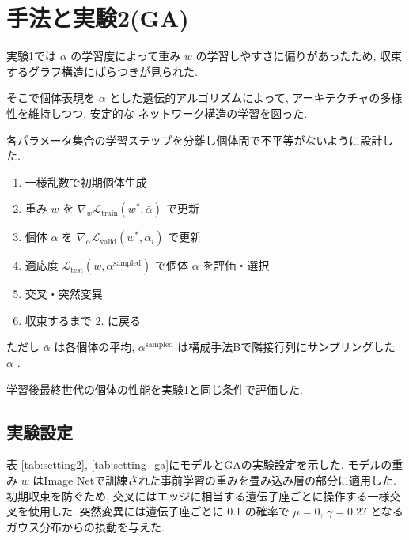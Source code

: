 \documentclass[twocolumn]{jarticle}     %
\begin{document}
\section{手法と実験2(GA)}
実験1では $\alpha$ の学習度によって重み $w$ の学習しやすさに偏りがあったため,
収束するグラフ構造にばらつきが見られた.

そこで個体表現を $\alpha$ とした遺伝的アルゴリズムによって,
アーキテクチャの多様性を維持しつつ, 安定的な
ネットワーク構造の学習を図った.

各パラメータ集合の学習ステップを分離し個体間で不平等がないように設計した.

\begin{enumerate}
  \item 一様乱数で初期個体生成
  \item 重み $w$ を $\displaystyle \nabla_w \mathcal{L}_{\mathrm{train}}(w^*, \bar{\alpha})$ で更新
  \item 個体 $\alpha$ を $\displaystyle \nabla_\alpha \mathcal{L}_{\mathrm{valid}}(w^*, \alpha_i)$ で更新
  \item 適応度 $\displaystyle \mathcal{L}_{\mathrm{test}}(w, \alpha^\mathrm{sampled})$ で個体 $\alpha$ を評価・選択
  \item 交叉・突然変異
  \item 収束するまで 2. に戻る
\end{enumerate}
ただし
$\bar{\alpha}$ は各個体の平均,
$\alpha^\mathrm{sampled}$ は構成手法Bで隣接行列にサンプリングした $\alpha$ .

学習後最終世代の個体の性能を実験1と同じ条件で評価した.

\subsection{実験設定}

表 \ref{tab:setting2}, \ref{tab:setting_ga}にモデルとGAの実験設定を示した.
モデルの重み $w$ はImage Netで訓練された事前学習の重みを畳み込み層の部分に適用した.
初期収束を防ぐため, 交叉にはエッジに相当する遺伝子座ごとに操作する一様交叉を使用した.
突然変異には遺伝子座ごとに 0.1 の確率で $\mu=0$, $\gamma=0.2?$ となるガウス分布からの摂動を与えた.
\end{document}

